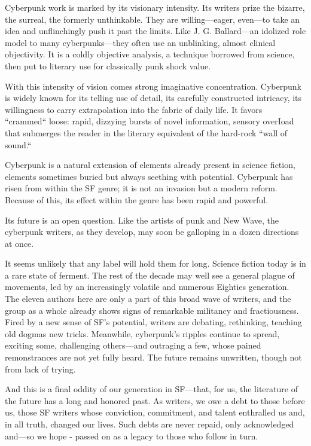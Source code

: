 Cyberpunk work is marked by its visionary intensity. Its writers prize the bizarre, the surreal, the formerly unthinkable. They are willing---eager, even---to take an idea and unflinchingly push it past the limits. Like J. G. Ballard---an idolized role model to many cyberpunks---they often use an unblinking, almost clinical objectivity. It is a coldly objective analysis, a technique borrowed from science, then put to literary use for classically punk shock value.

With this intensity of vision comes strong imaginative concentration. Cyberpunk is widely known for its telling use of detail, its carefully constructed intricacy, its willingness to carry extrapolation into the fabric of daily life. It favors ``crammed`` loose: rapid, dizzying bursts of novel information, sensory overIoad that submerges the reader in the literary equivalent of the hard-rock ``wall of sound.``

Cyberpunk is a natural extension of elements already present in science fiction, elements sometimes buried but always seething with potential. Cyberpunk has risen from within the SF genre; it is not an invasion but a modern reform. Because of this, its effect within the genre has been rapid and powerful.

Its future is an open question. Like the artists of punk and New Wave, the cyberpunk writers, as they develop, may soon be galloping in a dozen directions at once.

It seems unlikely that any label will hold them for long. Science fiction today is in a rare state of ferment. The rest of the decade may well see a general plague of movements, led by an increasingly volatile and numerous Eighties generation. The eleven authors here are only a part of this broad wave of writers, and the group as a whole already shows signs of remarkable militancy and fractiousness. Fired by a new sense of SF's potential, writers are debating, rethinking, teaching old dogmas new tricks. Meanwhile, cyberpunk's ripples continue to spread, exciting some, challenging others---and outraging a few, whose pained remonstrances are not yet fully heard.
The future remains unwritten, though not from lack of trying.

And this is a final oddity of our generation in SF---that, for us, the literature of the future has a long and honored past. As writers, we owe a debt to those before us, those SF writers whose conviction, commitment, and talent enthralled us and, in all truth, changed our lives. Such debts are never repaid, only acknowledged and---so we hope - passed on as a legacy to those who follow in turn.

